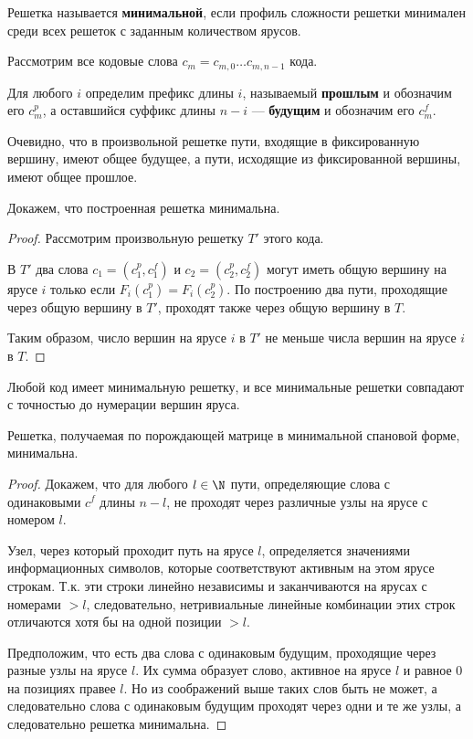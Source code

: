 \begin{definition}
    Решетка называется \textbf{минимальной}, если профиль сложности решетки минимален среди всех решеток с заданным количеством ярусов.
\end{definition}

Рассмотрим все кодовые слова \(c_m = c_{m,0} \dots c_{m,n - 1}\) кода.

Для любого \(i\) определим префикс длины \(i\), называемый \textbf{прошлым} и обозначим его \(c_m^p\), а оставшийся суффикс длины \(n - i\) --- \textbf{будущим} и обозначим его \(c_m^f\).

Очевидно, что в произвольной решетке пути, входящие в фиксированную вершину, имеют общее будущее, а пути, исходящие из фиксированной вершины, имеют общее прошлое. %

\unfinished

Докажем, что построенная решетка минимальна.
\begin{proof}
    Рассмотрим произвольную решетку \(T'\) этого кода.

    В \(T'\) два слова \(c_1 = (c_1^p, c_1^f)\) и \(c_2 = (c_2^p, c_2^f)\) могут иметь общую вершину на ярусе \(i\) только если \(F_i(c_1^p) = F_i(c_2^p)\).
    По построению два пути, проходящие через общую вершину в \(T'\), проходят также через общую вершину в \(T\).

    Таким образом, число вершин на ярусе \(i\) в \(T'\) не меньше числа вершин на ярусе \(i\) в \(T\).
\end{proof}

\begin{theorem}
    Любой код имеет минимальную решетку, и все минимальные решетки совпадают с точностью до нумерации вершин яруса.
\end{theorem}

\unfinished

\begin{theorem}
    Решетка, получаемая по порождающей матрице в минимальной спановой форме, минимальна.
\end{theorem}
\begin{proof}
    Докажем, что для любого \(l \in \N\) пути, определяющие слова с одинаковыми \(c^f\) длины \(n - l\), не проходят через различные узлы на ярусе с номером \(l\).

    Узел, через который проходит путь на ярусе \(l\), определяется значениями информационных символов, которые соответствуют активным на этом ярусе строкам. Т.к. эти строки линейно независимы и заканчиваются на ярусах с номерами \( > l\), следовательно, нетривиальные линейные комбинации этих строк отличаются хотя бы на одной позиции \( > l\).

    Предположим, что есть два слова с одинаковым будущим, проходящие через разные узлы на ярусе \(l\).
    Их сумма образует слово, активное на ярусе \(l\) и равное \(0\) на позициях правее \(l\).
    Но из соображений выше таких слов быть не может,
    а следовательно слова с одинаковым будущим проходят через одни и те же узлы,
    а следовательно решетка минимальна.
\end{proof}

